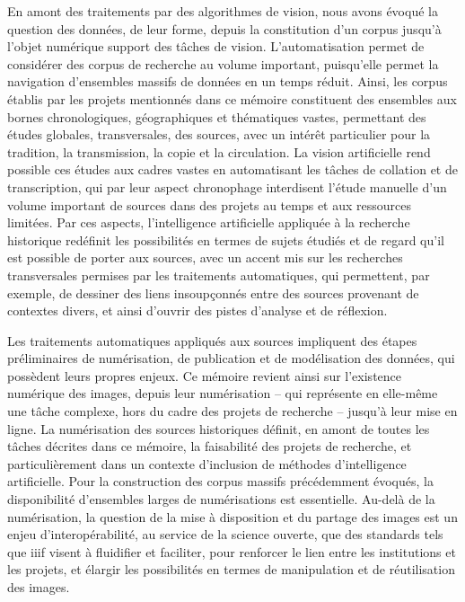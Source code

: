 \documentclass[a4paper,12pt,twoside]{book}
\newcommand{\ia}{intelligence artificielle\xspace}
\newcommand{\iiif}{\gls{iiif}\xspace}
\begin{document}
	En amont des traitements par des algorithmes de vision, nous avons évoqué la question des données, de leur forme, depuis la constitution d'un corpus jusqu'à l'objet numérique support des tâches de vision. L'automatisation permet de considérer des corpus de recherche au volume important, puisqu'elle permet la navigation d'ensembles massifs de données en un temps réduit. Ainsi, les corpus établis par les projets mentionnés dans ce mémoire constituent des ensembles aux bornes chronologiques, géographiques et thématiques vastes, permettant des études globales, transversales, des sources, avec un intérêt particulier pour la tradition, la transmission, la copie et la circulation. La vision artificielle rend possible ces études aux cadres vastes en automatisant les tâches de collation et de transcription, qui par leur aspect chronophage interdisent l'étude manuelle d'un volume important de sources dans des projets au temps et aux ressources limitées. Par ces aspects, l'\ia appliquée à la recherche historique redéfinit les possibilités en termes de sujets étudiés et de regard qu'il est possible de porter aux sources, avec un accent mis sur les recherches transversales permises par les traitements automatiques, qui permettent, par exemple, de dessiner des liens insoupçonnés entre des sources provenant de contextes divers, et ainsi d'ouvrir des pistes d'analyse et de réflexion.
	
	Les traitements automatiques appliqués aux sources impliquent des étapes préliminaires de numérisation, de publication et de modélisation des données, qui possèdent leurs propres enjeux. Ce mémoire revient ainsi sur l'existence numérique des images, depuis leur numérisation -- qui représente en elle-même une tâche complexe, hors du cadre des projets de recherche -- jusqu'à leur mise en ligne. La numérisation des sources historiques définit, en amont de toutes les tâches décrites dans ce mémoire, la faisabilité des projets de recherche, et particulièrement dans un contexte d'inclusion de méthodes d'\ia. Pour la construction des corpus massifs précédemment évoqués, la disponibilité d'ensembles larges de numérisations est essentielle. Au-delà de la numérisation, la question de la mise à disposition et du partage des images est un enjeu d'interopérabilité, au service de la science ouverte, que des standards tels que \iiif visent à fluidifier et faciliter, pour renforcer le lien entre les institutions et les projets, et élargir les possibilités en termes de manipulation et de réutilisation des images.
	\\
	
\end{document}

